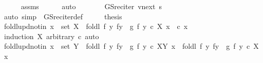 \begin{isabellebody}
\ \ \ \ \isamarkupfalse%
\ assms\isanewline
\ \ \ \ \isamarkupfalse%
\ auto\isanewline
\ \ \isamarkupfalse%
\ \isamarkupfalse%
\ {\isachardoublequoteopen}{\isasymdots}\ {\isacharequal}{\kern0pt}\ GS{\isacharunderscore}{\kern0pt}rec{\isacharunderscore}{\kern0pt}iter\ v{\isacharunderscore}{\kern0pt}next\ s{\isachardoublequoteclose}\isanewline
\ \ \ \ \isamarkupfalse%
\ {\isacharparenleft}{\kern0pt}auto\ simp{\isacharcolon}{\kern0pt}\ {\isacharasterisk}{\kern0pt}\ GS{\isacharunderscore}{\kern0pt}rec{\isacharunderscore}{\kern0pt}iter{\isacharunderscore}{\kern0pt}def{\isacharparenright}{\kern0pt}\isanewline
\ \ \isamarkupfalse%
\ \isamarkupfalse%
\ {\isacharquery}{\kern0pt}thesis\ \isacommand{{\isachardot}{\kern0pt}}\isamarkupfalse%
\isanewline
{}\isamarkupfalse%
%
\endisatagproof
{\isafoldproof}%
%
\isadelimproof
\isanewline
%
\endisadelimproof
\isanewline
{}\isamarkupfalse%
\ foldl{\isacharunderscore}{\kern0pt}upd{\isacharunderscore}{\kern0pt}notin{\isacharcolon}{\kern0pt}\ {\isachardoublequoteopen}x\ {\isasymnotin}\ set\ X\ {\isasymLongrightarrow}\ foldl\ {\isacharparenleft}{\kern0pt}{\isasymlambda}f\ y{\isachardot}{\kern0pt}\ f{\isacharparenleft}{\kern0pt}y\ {\isacharcolon}{\kern0pt}{\isacharequal}{\kern0pt}\ g\ f\ y{\isacharparenright}{\kern0pt}{\isacharparenright}{\kern0pt}\ c\ X\ x\ {\isacharequal}{\kern0pt}\ c\ x{\isachardoublequoteclose}\isanewline
%
\isadelimproof
\ \ %
\endisadelimproof
%
\isatagproof
{}\isamarkupfalse%
\ {\isacharparenleft}{\kern0pt}induction\ X\ arbitrary{\isacharcolon}{\kern0pt}\ c{\isacharparenright}{\kern0pt}\ auto%
\endisatagproof
{\isafoldproof}%
%
\isadelimproof
\isanewline
%
\endisadelimproof
\isanewline
{}\isamarkupfalse%
\ foldl{\isacharunderscore}{\kern0pt}upd{\isacharunderscore}{\kern0pt}notin{\isacharprime}{\kern0pt}{\isacharcolon}{\kern0pt}\ {\isachardoublequoteopen}x\ {\isasymnotin}\ set\ Y\ {\isasymLongrightarrow}\ foldl\ {\isacharparenleft}{\kern0pt}{\isasymlambda}f\ y{\isachardot}{\kern0pt}\ f{\isacharparenleft}{\kern0pt}y\ {\isacharcolon}{\kern0pt}{\isacharequal}{\kern0pt}\ g\ f\ y{\isacharparenright}{\kern0pt}{\isacharparenright}{\kern0pt}\ c\ {\isacharparenleft}{\kern0pt}X{\isacharat}{\kern0pt}Y{\isacharparenright}{\kern0pt}\ x\ {\isacharequal}{\kern0pt}\ foldl\ {\isacharparenleft}{\kern0pt}{\isasymlambda}f\ y{\isachardot}{\kern0pt}\ f{\isacharparenleft}{\kern0pt}y\ {\isacharcolon}{\kern0pt}{\isacharequal}{\kern0pt}\ g\ f\ y{\isacharparenright}{\kern0pt}{\isacharparenright}{\kern0pt}\ c\ X\ x{\isachardoublequoteclose}\isanewline

\end{isabellebody}
